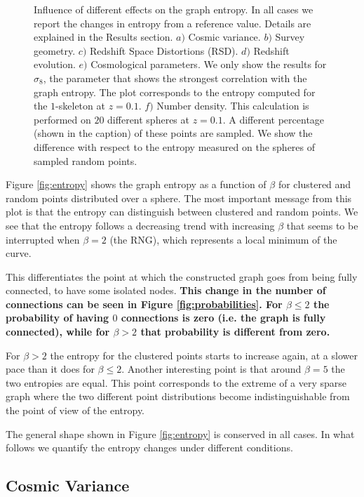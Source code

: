 \documentclass[fleqn,usenatbib]{mnras}
\begin{document}
\begin{figure}
    \caption{Influence of different effects on the graph entropy. In all cases we 
    report the changes in entropy from a reference value. 
    Details are explained in the Results section. $a)$ Cosmic variance. 
    $b)$ Survey geometry. 
    $c)$ Redshift Space Distortions (RSD).
    $d)$ Redshift evolution.
    $e)$ Cosmological parameters. We only show the results for $\sigma_8$, 
    the parameter that shows the strongest correlation with the graph entropy.
    The plot corresponds to the entropy computed for the $1$-skeleton at $z=0.1$. 
    $f)$ Number density. 
    This calculation is performed on $20$ different spheres at $z=0.1$.
    A different percentage (shown in the caption) of these points are sampled. 
    We show the difference with respect to the entropy measured on the spheres 
    of sampled random points.\label{fig:diferencias}}
\end{figure}    


Figure \ref{fig:entropy} shows the graph entropy as a function of $\beta$ for
clustered and random points distributed over a sphere.
The most important message from this plot is that the entropy can distinguish between
clustered and random points.
We see that the entropy follows a decreasing trend with increasing
$\beta$ that seems to be interrupted when $\beta=2$ (the RNG), which
represents a local minimum of the curve.  

This differentiates the point at which the constructed graph goes from
being fully connected, to have some isolated nodes.
\textbf{This change in the number of connections can be seen
  in Figure \ref{fig:probabilities}.
For $\beta\leq 2$ the probability of having $0$ connections is zero
(i.e. the graph is fully connected), while for $\beta>2$ that
probability is different from zero.}

For $\beta>2$ the entropy for the clustered points starts to
increase again, at a slower pace than it does for $\beta\leq 2$. 
Another interesting point is that around $\beta=5$ the two entropies
are equal.  
This point corresponds to the extreme of a very sparse graph where the
two different point distributions become indistinguishable from the
point of view of the entropy. 


The general shape shown in Figure \ref{fig:entropy} is conserved in
all cases.  
In what follows we quantify the entropy changes under different
conditions.

\subsection{Cosmic Variance}
\end{document}
